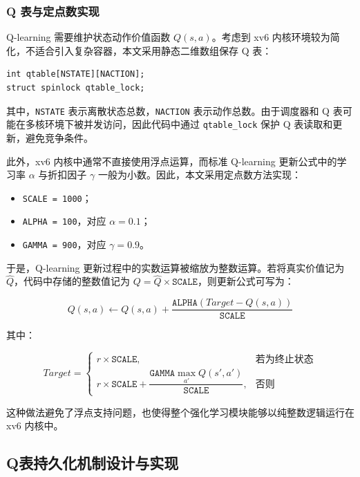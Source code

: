 \subsubsection{Q 表与定点数实现}

Q-learning 需要维护状态动作价值函数 $Q(s,a)$。考虑到 xv6 内核环境较为简化，不适合引入复杂容器，本文采用静态二维数组保存 Q 表：

\begin{verbatim}
int qtable[NSTATE][NACTION];
struct spinlock qtable_lock;
\end{verbatim}

其中，\texttt{NSTATE} 表示离散状态总数，\texttt{NACTION} 表示动作总数。由于调度器和 Q 表可能在多核环境下被并发访问，因此代码中通过 \texttt{qtable\_lock} 保护 Q 表读取和更新，避免竞争条件。

此外，xv6 内核中通常不直接使用浮点运算，而标准 Q-learning 更新公式中的学习率 $\alpha$ 与折扣因子 $\gamma$ 一般为小数。因此，本文采用定点数方法实现：

\begin{itemize}
\item \texttt{SCALE = 1000}；
\item \texttt{ALPHA = 100}，对应 $\alpha = 0.1$；
\item \texttt{GAMMA = 900}，对应 $\gamma = 0.9$。
\end{itemize}

于是，Q-learning 更新过程中的实数运算被缩放为整数运算。若将真实价值记为 $\hat{Q}$，代码中存储的整数值记为 $Q = \hat{Q} \times \texttt{SCALE}$，则更新公式可写为：

\begin{equation}
Q(s,a) \leftarrow Q(s,a) + \frac{\texttt{ALPHA}\left(Target - Q(s,a)\right)}{\texttt{SCALE}}
\end{equation}

其中：

\begin{equation}
Target=
\begin{cases}
r \times \texttt{SCALE}, & \text{若为终止状态} \\
r \times \texttt{SCALE} + \dfrac{\texttt{GAMMA}\max_{a'}Q(s',a')}{\texttt{SCALE}}, & \text{否则}
\end{cases}
\end{equation}

这种做法避免了浮点支持问题，也使得整个强化学习模块能够以纯整数逻辑运行在 xv6 内核中。

\subsection{Q表持久化机制设计与实现}

